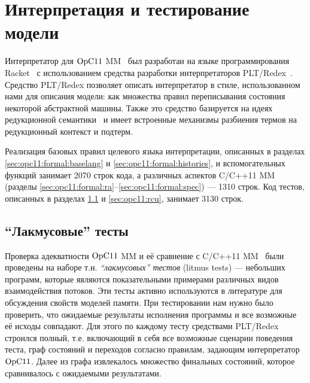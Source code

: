  
\section{Интерпретация и тестирование модели}
\label{sec:opc11:interpreter}

Интерпретатор для $\mathrm{OpC11}$ MM~\cite{opCppCode} был разработан на языке программирования Racket~\cite{Flatt-PLT:TR10,RacketLang}%
с использованием средства разработки интерпретаторов PLT/Redex~\cite{Klein-al:POPL12,Felleisen-al:BOOK09}.
Средство PLT/Redex позволяет описать интерпретатор в стиле, использованном нами для описания модели:
как множества правил переписывания состояния некоторой абстрактной машины.
Также это средство базируется на идеях редукционной семантики~\cite{Klein-al:POPL12,Felleisen-al:BOOK09,Felleisen-Hieb:TCS92}
и имеет встроенные механизмы разбиения термов на редукционный контекст и подтерм.

Реализация базовых правил целевого языка интерпретации, описанных в разделах
\ref{sec:opc11:formal:baselang} и \ref{sec:opc11:formal:histories}, и вспомогательных функций занимает
2070 строк кода, а различных аспектов C/C++11 MM
(разделы \ref{sec:opc11:formal:ra}--\ref{sec:opc11:formal:spec})
--- 1310 строк.
Код тестов, описанных в разделах \ref{sec:opc11:litmus} и \ref{sec:opc11:rcu}, занимает 3130 строк.

\subsection{``Лакмусовые'' тесты}
\label{sec:opc11:litmus}
Проверка адекватности $\mathrm{OpC11}$ MM и её сравнение с C/C++11 MM~\cite{Batty-al:POPL11}
были проведены на наборе т.н. \emph{``лакмусовых'' тестов} (litmus tests) --- небольших программ, которые
являются показательными примерами различных видов взаимодействия потоков. Эти тесты активно используются в литературе
\cite{Bornat-al:LACE,Batty-al:POPL11,Lahav-al:POPL16,Maranget-al:tutorial,Turon-al:OOPSLA14}
для обсуждения свойств моделей памяти.
При тестировании нам нужно было проверить, что ожидаемые результаты
исполнения программы и все возможные её исходы совпадают.
Для этого по каждому тесту средствами PLT/Redex строился полный, т.е. включающий в себя все возможные сценарии
поведения теста, граф состояний и переходов согласно правилам, задающим интерпретатор $\mathrm{OpC11}$.
Далее из графа извлекалось множество финальных состояний, которое сравнивалось с ожидаемыми результатами.

